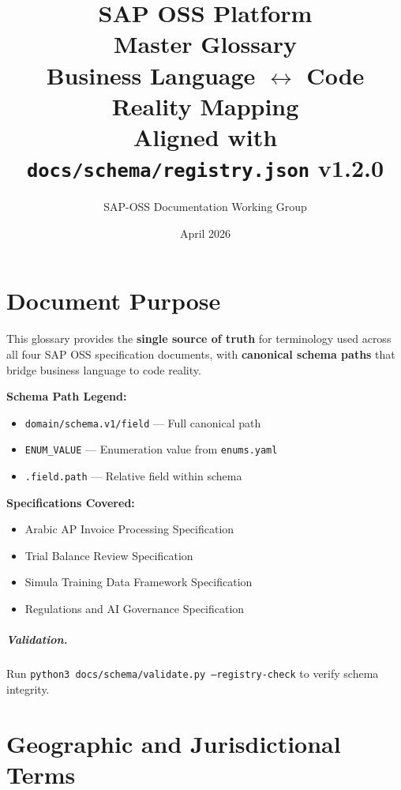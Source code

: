 \documentclass[11pt,a4paper]{report}
\title{\vspace{-2em}\Large SAP OSS Platform \\
       \textbf{Master Glossary} \\[0.4em]
       \large Business Language $\leftrightarrow$ Code Reality Mapping \\
       Aligned with \texttt{docs/schema/registry.json} v1.2.0}
\author{SAP-OSS Documentation Working Group}
\date{April 2026}
\newcommand{\schemapath}[1]{\texttt{\textcolor{pathcolor}{#1}}}
\newcommand{\enumval}[1]{\texttt{\textcolor{sapgreen}{#1}}}
\newcommand{\fieldref}[1]{\texttt{\textcolor{sapblue}{#1}}}
\begin{document}
\maketitle

\chapter*{Document Purpose}

This glossary provides the \textbf{single source of truth} for terminology used
across all four SAP OSS specification documents, with \textbf{canonical schema paths}
that bridge business language to code reality.

\begin{mdframed}[style=schemabox]
\textbf{Schema Path Legend:}
\begin{itemize}[nosep]
  \item \schemapath{domain/schema.v1/field} --- Full canonical path
  \item \enumval{ENUM\_VALUE} --- Enumeration value from \texttt{enums.yaml}
  \item \fieldref{.field.path} --- Relative field within schema
\end{itemize}
\end{mdframed}

\vspace{3mm}

\textbf{Specifications Covered:}
\begin{itemize}
  \item Arabic AP Invoice Processing Specification
  \item Trial Balance Review Specification
  \item Simula Training Data Framework Specification
  \item Regulations and AI Governance Specification
\end{itemize}

\paragraph{Validation.} Run \texttt{python3 docs/schema/validate.py --registry-check}
to verify schema integrity.

\tableofcontents
\newpage

\chapter{Geographic and Jurisdictional Terms}
\end{document}
